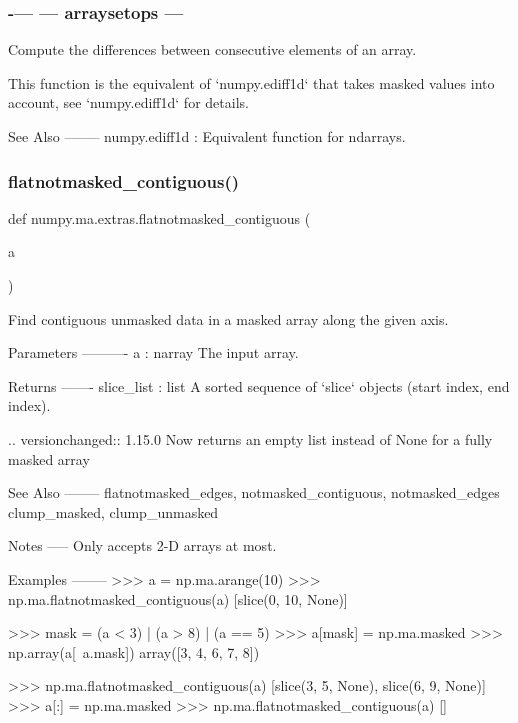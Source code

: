 \subsubsection*{-\/--- --- arraysetops --- }

\begin{DoxyVerb}Compute the differences between consecutive elements of an array.

This function is the equivalent of `numpy.ediff1d` that takes masked
values into account, see `numpy.ediff1d` for details.

See Also
--------
numpy.ediff1d : Equivalent function for ndarrays.\end{DoxyVerb}
 \mbox{\label{namespacenumpy_1_1ma_1_1extras_aa26343936ff8088bc217f4a860d23501}} 
\subsubsection{\texorpdfstring{flatnotmasked\+\_\+contiguous()}{flatnotmasked\_contiguous()}}
{\footnotesize\ttfamily def numpy.\+ma.\+extras.\+flatnotmasked\+\_\+contiguous (\begin{DoxyParamCaption}\item[{}]{a }\end{DoxyParamCaption})}

\begin{DoxyVerb}Find contiguous unmasked data in a masked array along the given axis.

Parameters
----------
a : narray
    The input array.

Returns
-------
slice_list : list
    A sorted sequence of `slice` objects (start index, end index).

    .. versionchanged:: 1.15.0
        Now returns an empty list instead of None for a fully masked array

See Also
--------
flatnotmasked_edges, notmasked_contiguous, notmasked_edges
clump_masked, clump_unmasked

Notes
-----
Only accepts 2-D arrays at most.

Examples
--------
>>> a = np.ma.arange(10)
>>> np.ma.flatnotmasked_contiguous(a)
[slice(0, 10, None)]

>>> mask = (a < 3) | (a > 8) | (a == 5)
>>> a[mask] = np.ma.masked
>>> np.array(a[~a.mask])
array([3, 4, 6, 7, 8])

>>> np.ma.flatnotmasked_contiguous(a)
[slice(3, 5, None), slice(6, 9, None)]
>>> a[:] = np.ma.masked
>>> np.ma.flatnotmasked_contiguous(a)
[]\end{DoxyVerb}
 \mbox{\label{namespacenumpy_1_1ma_1_1extras_ae218290520443ec7ea1429993ad6ec4d}} 
